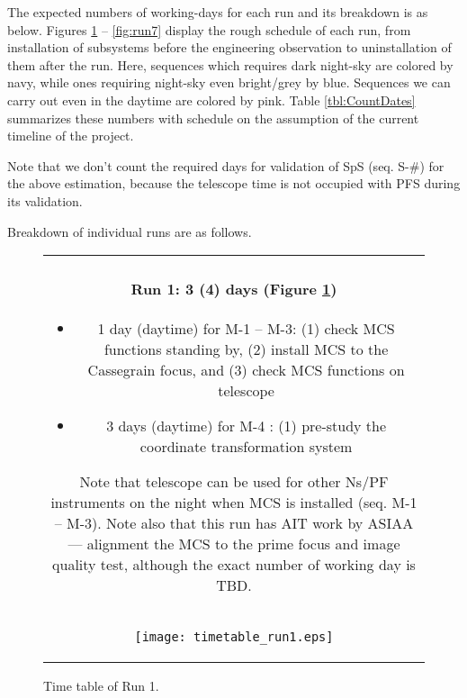 The expected numbers of working-days for each run and its breakdown is as below.
Figures \ref{fig:run1} -- \ref{fig:run7}  display the rough schedule of each run, from installation of subsystems before the engineering observation to uninstallation of them after the run.
Here, sequences which requires dark night-sky are colored by navy, while ones requiring night-sky even bright/grey by blue.
Sequences we can carry out even in the daytime are colored by pink.
Table \ref{tbl:CountDates} summarizes these numbers with schedule on the assumption of the current timeline of the project.

Note that we don't count the required days for validation of SpS (seq. S-\#) for the above estimation, because the telescope time is not occupied with PFS during its validation.

\bigskip

Breakdown of individual runs are as follows.

\begin{figure}[!ht]
\begin{center}
\begin{tabular}{c}
\begin{minipage}{0.95\hsize}
\paragraph{Run 1: 3 (4) days (Figure \ref{fig:run1})}
	\begin{itemize}
 	\item 1 day (daytime) for M-1 --  M-3: 
	(1) check MCS functions standing by,
	(2) install MCS to the Cassegrain focus, and
	(3) check MCS functions on telescope
 	\item 3 days (daytime) for M-4 : 
	(1) pre-study the coordinate transformation system
	\end{itemize}
Note that telescope can be used for other Ns/PF instruments on the night when MCS is installed (seq. M-1 -- M-3).
Note also that this run has AIT work by ASIAA --- alignment the MCS to the prime focus and image quality test, although the exact number of working day is TBD.
\end{minipage} \\
\begin{minipage}{0.8\hsize}
	\begin{center}
	\vspace*{5mm}
	\texttt{[image: timetable\_run1.eps]}
	\end{center}
	\vspace*{-5mm}
	\caption{Time table of Run 1.}
	\label{fig:run1}
\end{minipage}
\end{tabular}
\end{center}
\end{figure}

